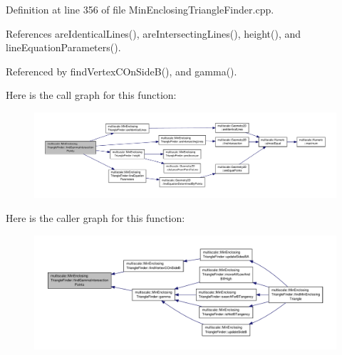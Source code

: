Definition at line 356 of file Min\-Enclosing\-Triangle\-Finder.\-cpp.



References are\-Identical\-Lines(), are\-Intersecting\-Lines(), height(), and line\-Equation\-Parameters().



Referenced by find\-Vertex\-C\-On\-Side\-B(), and gamma().



Here is the call graph for this function\-:\nopagebreak
\begin{figure}[H]
\begin{center}
\leavevmode
\includegraphics[width=350pt]{classmultiscale_1_1MinEnclosingTriangleFinder_a9eedc43ea3190d8ee6343879dc100edb_cgraph}
\end{center}
\end{figure}




Here is the caller graph for this function\-:\nopagebreak
\begin{figure}[H]
\begin{center}
\leavevmode
\includegraphics[width=350pt]{classmultiscale_1_1MinEnclosingTriangleFinder_a9eedc43ea3190d8ee6343879dc100edb_icgraph}
\end{center}
\end{figure}


